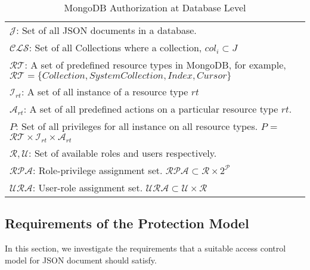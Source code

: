 \begin{table*}[t] \footnotesize
	\centering
	\caption{MongoDB Authorization  at Database Level }
	\label{table:mongo-auth-model}
	\begin{tabular}{p{\textwidth}}
		
		\hline
		
		$\mathcal{J}$: Set of all JSON documents in a database.\\
		
		$\mathcal{CLS}$: Set of all Collections where a collection, $col_i \subset J$ \\
	
		$\mathcal{RT}$: A set of predefined resource types in MongoDB, for example,  $  \mathcal{RT} = \{Collection, System Collection, Index, Cursor \}  $\\ 
		
		$\mathcal{I}_{rt}$: A set of all instance of a resource type $rt$ \\
		
		$\mathcal{A}_{rt}$: A set of all predefined actions on a particular resource type $rt$. \\
		
		$P$: Set of all  privileges for all instance on all resource types. $P$ = $\mathcal{RT} \times \mathcal{I}_{rt}  \times  \mathcal{A}_{rt}$ \\
	
		$\mathcal {R}, \mathcal{U}$: Set of available roles and users respectively.\\
		
		$\mathcal{RPA}$: Role-privilege assignment set. $\mathcal{RPA} \subset  \mathcal{R}  \times 2^\mathcal{P}$ \\
		
		$\mathcal{URA}$: User-role assignment set. $\mathcal{URA} \subset  \mathcal{U}  \times \mathcal{R}$\\
		
		\hline
	\end{tabular}
\end{table*}






\iffalse
\subsection {Requirements of the Protection Model}
\label{sec:access-control-requirements}
In this section, we investigate the requirements that a suitable access control model for JSON document should satisfy.

